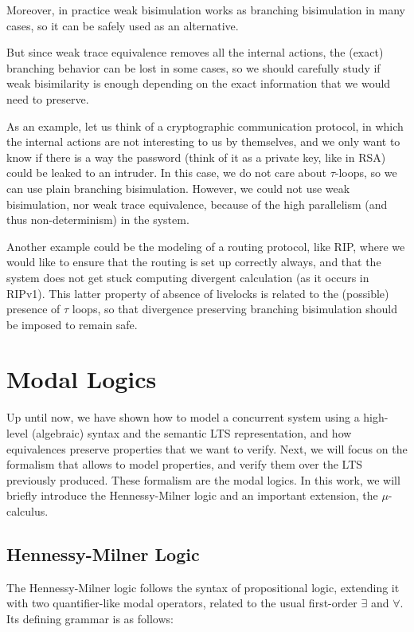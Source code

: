 \documentclass[11pt]{article}
\theoremstyle{definition}
\theoremstyle{plain}
\begin{document}
Moreover, in practice weak bisimulation works as branching bisimulation in many cases, so it can be safely used as an alternative.

But since weak trace equivalence removes all the internal actions, the (exact) branching behavior can be lost in some cases, so we should carefully study if weak bisimilarity is enough depending on the exact information that we would need to preserve.

As an example, let us think of a cryptographic communication protocol, in which the internal actions are not interesting to us by themselves, and we only want to know if there is a way the password (think of it as a private key, like in RSA) could be leaked to an intruder. In this case, we do not care about $ \tau $-loops, so we can use plain branching bisimulation. However, we could not use weak bisimulation, nor weak trace equivalence, because of the high parallelism (and thus non-determinism) in the system.

Another example could be the modeling of a routing protocol, like RIP, where we would like to ensure that the routing is set up correctly always, and that the system does not get stuck computing divergent calculation (as it occurs in RIPv1). This latter property of absence of livelocks is related to the (possible) presence of $ \tau  $ loops, so that divergence preserving branching bisimulation should be imposed to remain safe.

\clearpage

\section{Modal Logics}
Up until now, we have shown how to model a concurrent system using a high-level (algebraic) syntax and the semantic LTS representation, and how equivalences preserve properties that we want to verify. Next, we will focus on the formalism that allows to model properties, and verify them over the LTS previously produced. These formalism are the modal logics. In this work, we will briefly introduce the Hennessy-Milner logic and an important extension, the $ \mu $-calculus.
\subsection{Hennessy-Milner Logic}
The Hennessy-Milner logic follows the syntax of propositional logic, extending it with two quantifier-like  modal operators, related to the usual first-order $ \exists $ and $ \forall $. Its defining grammar is as follows:
\end{document}
